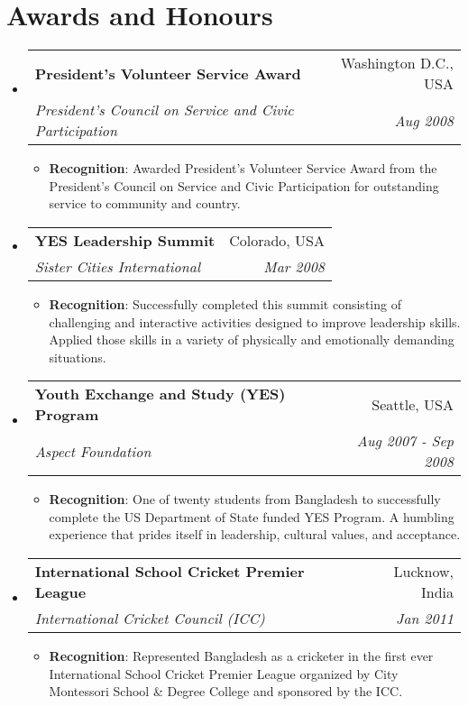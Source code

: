 \documentclass[letterpaper,11pt]{article}
\makeatletter
\newcommand{\resumeItem}[2]{
  \item\small{
    \textbf{#1}{: #2 \vspace{-2pt}}
  }
}
\newcommand{\resumeSubheading}[4]{
  \vspace{-1pt}\item
    \begin{tabular*}{0.97\textwidth}[t]{l@{\extracolsep{\fill}}r}
      \textbf{#1} & #2 \\
      \textit{\small#3} & \textit{\small #4} \\
    \end{tabular*}\vspace{-5pt}
}
\newcommand{\resumeSubHeadingListStart}{\begin{itemize}[leftmargin=*]}
\newcommand{\resumeSubHeadingListEnd}{\end{itemize}}
\newcommand{\resumeItemListStart}{\begin{itemize}}
\newcommand{\resumeItemListEnd}{\end{itemize}\vspace{-5pt}}
\makeatother
\begin{document}
\section{Awards and Honours}
  \resumeSubHeadingListStart
  \resumeSubheading
      {President's Volunteer Service Award}{Washington D.C., USA}
      {President's Council on Service and Civic Participation}{Aug 2008}
      \resumeItemListStart
      	\resumeItem{Recognition}{Awarded President's Volunteer Service Award from the President's Council on Service and Civic Participation for outstanding service to community and country.}
      \resumeItemListEnd 
    \resumeSubheading
      {YES Leadership Summit}{Colorado, USA}
      {Sister Cities International}{Mar 2008}
      \resumeItemListStart
      	\resumeItem{Recognition}{Successfully completed this summit consisting of challenging and interactive activities designed to improve leadership skills. Applied those skills in a variety of physically and emotionally demanding situations.}
      \resumeItemListEnd 
    \resumeSubheading
      {Youth Exchange and Study (YES) Program}{Seattle, USA}
      {Aspect Foundation}{Aug 2007 - Sep 2008}
      \resumeItemListStart
      	\resumeItem{Recognition}{One of twenty students from Bangladesh to successfully complete the US Department of State funded YES Program. A humbling experience that prides itself in leadership, cultural values, and acceptance.}
      \resumeItemListEnd 
    \resumeSubheading
      {International School Cricket Premier League}{Lucknow, India}
      {International Cricket Council (ICC)}{Jan 2011 }
      \resumeItemListStart
      	\resumeItem{Recognition}{Represented Bangladesh as a cricketer in the first ever International School Cricket Premier League organized by City Montessori School \& Degree College and sponsored by the ICC.}
      \resumeItemListEnd 
  \resumeSubHeadingListEnd
  
\end{document}

